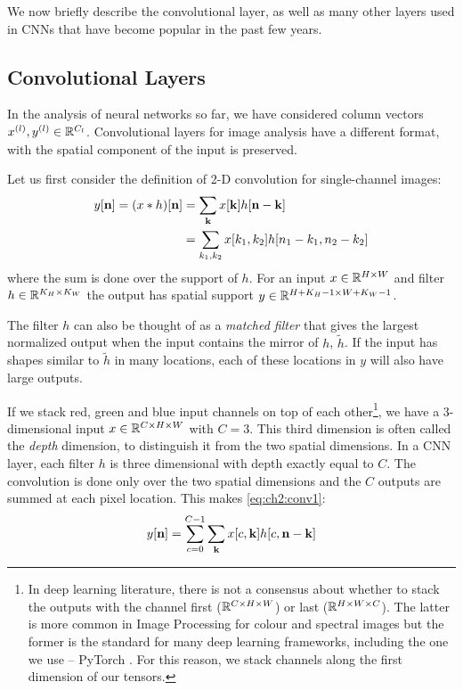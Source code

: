 We now briefly describe the convolutional layer, as well as many other layers
used in CNNs that have become popular in the past few years.

\subsection{Convolutional Layers}\label{sec:ch2:conv_layers}
In the analysis of neural networks so far, we have considered column vectors
$x^{(l)},y^{(l)} \in \reals[C_{l}]$. Convolutional layers for image analysis
have a different format, with the spatial component of the input is
preserved.

Let us first consider the definition of 2-D convolution for single-channel
images:
\begin{align}
  y[\nn] = (x\conv h)[\nn] &= \sum_{\kk} x[\kk]h[\nn-\kk] \label{eq:ch2:conv1}\\
                           &= \sum_{k_1, k_2} x[k_1,k_2]h[n_1-k_1, n_2-k_2]
\end{align}
where the sum is done over the support of $h$. For an input $x\in \reals[H\x W]$
and filter $h\in \reals[K_H\x K_W]$ the output has spatial support $y\in
\reals[H+K_H-1 \x W+K_W-1]$.

The filter $h$ can also be thought of as a \emph{matched filter} that gives the largest normalized output when the input
contains the mirror of $h$, $\tilde{h}$. If the input has shapes similar to $\tilde{h}$ in many locations, each of these
locations in $y$ will also have large outputs.

If we stack red, green and blue input channels on top of each other\footnote{In deep
learning literature, there is not a consensus about whether to stack the outputs
with the channel first ($\reals[C\x H\x W]$) or last ($\reals[H\x W\x C]$). The
latter is more common in Image Processing for colour and spectral images but
the former is the standard for many deep learning frameworks, including the one
we use -- PyTorch \cite{paszke_automatic_2017}. For this reason, we stack
channels along the first dimension of our tensors.}, we have a
3-dimensional input $x \in \reals[C\x H\x W]$ with $C=3$.
This third dimension is often called the \emph{depth} dimension, to distinguish
it from the two spatial dimensions. In a CNN layer, each filter $h$ is three
dimensional with depth exactly equal to $C$. The convolution is
done only over the two spatial dimensions
and the $C$ outputs are summed at each pixel location. This makes
\eqref{eq:ch2:conv1}:
\begin{equation}
  y[\nn] = \sum_{c=0}^{C-1} \sum_{\kk} x[c, \kk]h[c, \nn-\kk]
  \label{eq:ch2:conv2}
\end{equation}

